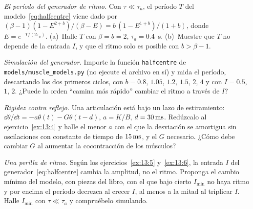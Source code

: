\begin{exercise}[\lvlB]
\label{ex:13:5}
\emph{El período del generador de ritmo.} Con $\tau\ll\tau_a$, el período $T$ del modelo~\eqref{eq:halfcentre} viene dado por $(\beta-1)(1-E^{2+b})/(\beta-E)=b\,(1-E^{1+b})/(1+b)$, donde $E=e^{-T/(2\tau_a)}$. (a)~Halle $T$ con $\beta=b=2$, $\tau_a=0.4$~s. (b)~Muestre que $T$ no depende de la entrada $I$, y que el ritmo solo es posible con $b>\beta-1$.
\end{exercise}

\begin{exercise}[\lvlB]
\label{ex:13:6}
\emph{Simulación del generador.} Importe la función \texttt{halfcentre} de \texttt{models/\allowbreak muscle\_models.py} (no ejecute el archivo en sí) y mida el período, descartando los dos primeros ciclos, con $b=0.8$, $1.05$, $1.2$, $1.5$, $2$, $4$ y con $I=0.5$, $1$, $2$. ¿Puede la orden “camina más rápido” cambiar el ritmo a través de $I$?
\end{exercise}

\begin{exercise}[\lvlB]
\label{ex:13:7}
\emph{Rigidez contra reflejo.} Una articulación está bajo un lazo de estiramiento: $\dd\theta/\dd t=-a\theta(t)-G\theta(t-d)$, $a=K/B$, $d=30\,\text{ms}$. Redúzcalo al ejercicio~\ref{ex:13:4} y halle el menor $a$ con el que la desviación se amortigua sin oscilaciones con constante de tiempo de $15\,\text{ms}$, y el $G$ necesario. ¿Cómo debe cambiar $G$ al aumentar la cocontracción de los músculos?
\end{exercise}

\begin{exercise}[\lvlC]
\label{ex:13:8}
\emph{Una perilla de ritmo.} Según los ejercicios~\ref{ex:13:5} y~\ref{ex:13:6}, la entrada $I$ del generador~\eqref{eq:halfcentre} cambia la amplitud, no el ritmo. Proponga el cambio mínimo del modelo, con piezas del libro, con el que bajo cierto $I_{\min}$ no haya ritmo y por encima el período decrezca al crecer $I$, al menos a la mitad al triplicar $I$. Halle $I_{\min}$ con $\tau\ll\tau_a$ y compruébelo simulando.
\end{exercise}
